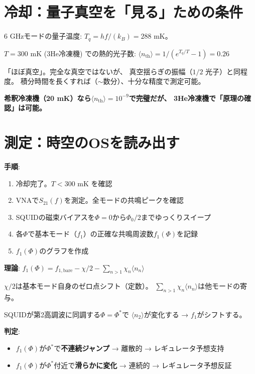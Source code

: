 \documentclass[12pt,a4paper]{article}
\begin{document}
\section{冷却：量子真空を「見る」ための条件}

\begin{theorybox}[なぜ300 mKで十分か]
6 GHzモードの量子温度: $T_q = h f/(k_B) = 288$ mK。

$T = 300$ mK (3He冷凍機) での熱的光子数:
$\langle n_{\mathrm{th}} \rangle = 1/(e^{T_q/T} - 1) = 0.26$

「ほぼ真空」。完全な真空ではないが、
真空揺らぎの振幅（$1/2$ 光子）と同程度。
積分時間を長くすれば（$\sim$数分）、十分な精度で測定可能。

\textbf{希釈冷凍機（20 mK）なら$\langle n_{\mathrm{th}} \rangle = 10^{-9}$で完璧だが、
3He冷凍機で「原理の確認」は可能。}
\end{theorybox}

\section{測定：時空のOSを読み出す}

\begin{practicebox}
\textbf{手順}:
\begin{enumerate}
\item 冷却完了。$T < 300$ mK を確認
\item VNAで$S_{21}(f)$を測定。全モードの共鳴ピークを確認
\item SQUIDの磁束バイアスを$\Phi = 0$から$\Phi_0/2$までゆっくりスイープ
\item 各$\Phi$で基本モード（$f_1$）の正確な共鳴周波数$f_1(\Phi)$を記録
\item $f_1(\Phi)$のグラフを作成
\end{enumerate}

\textbf{理論}:
$f_1(\Phi) = f_{1,\mathrm{bare}} - \chi/2 - \sum_{n>1} \chi_n \langle n_n \rangle$

$\chi/2$は基本モード自身のゼロ点シフト（定数）。
$\sum_{n>1} \chi_n \langle n_n \rangle$は他モードの寄与。

SQUIDが第2高調波に同調する$\Phi = \Phi^*$で
$\langle n_2 \rangle$が変化する → $f_1$がシフトする。

\textbf{判定}:
\begin{itemize}
\item $f_1(\Phi)$が$\Phi^*$で\textbf{不連続ジャンプ} → 離散的 → レギュレータ予想支持
\item $f_1(\Phi)$が$\Phi^*$付近で\textbf{滑らかに変化} → 連続的 → レギュレータ予想反証
\end{itemize}
\end{practicebox}
\end{document}

